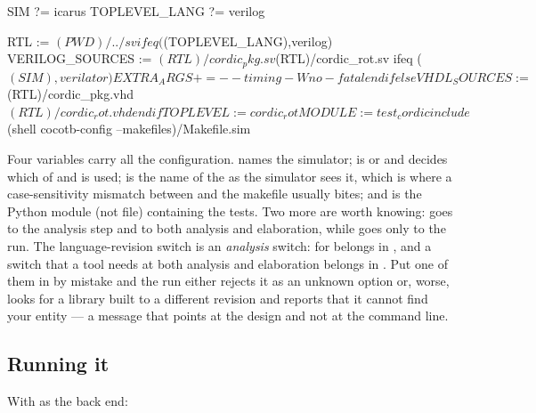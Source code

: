 \begin{makecode}
SIM           ?= icarus
TOPLEVEL_LANG ?= verilog

RTL := $(PWD)/../sv

ifeq ($(TOPLEVEL_LANG),verilog)
  VERILOG_SOURCES := $(RTL)/cordic_pkg.sv $(RTL)/cordic_rot.sv
  ifeq ($(SIM),verilator)
    EXTRA_ARGS += --timing -Wno-fatal
  endif
else
  VHDL_SOURCES := $(RTL)/cordic_pkg.vhd $(RTL)/cordic_rot.vhd
endif

TOPLEVEL := cordic_rot
MODULE   := test_cordic

include $(shell cocotb-config --makefiles)/Makefile.sim
\end{makecode}

Four variables carry all the configuration.  names the simulator;
 is  or  and decides which of
 and  is used;  is
the name of the \DUT{} as the simulator sees it, which is where a
case-sensitivity mismatch between \VHDL{} and the makefile usually bites; and
 is the Python module (not file) containing the tests. Two more
are worth knowing:  goes to the analysis step and
 to both analysis and elaboration, while 
goes only to the run. The language-revision switch is an \emph{analysis}
switch:  for  belongs in , and a
switch that a tool needs at both analysis and elaboration belongs in
. Put one of them in  by mistake and the run
either rejects it as an unknown option or, worse, looks for a library built to
a different revision and reports that it cannot find your entity --- a message
that points at the design and not at the command line.

\subsection{Running it}

With  as the back end:


